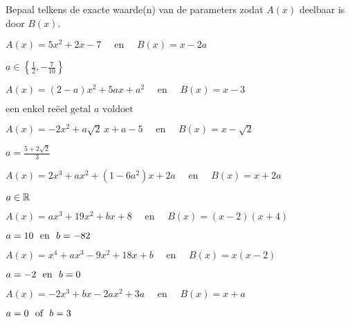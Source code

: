 \documentclass{ximera}
\begin{document}
\begin{exercise}
Bepaal telkens de exacte waarde(n) van de parameters zodat $A(x)$ deelbaar is door $B(x)$. 
	\begin{question} \( A(x) = 5x^2+2x-7                    \quad \text{ en } \quad B(x) = x-2a       \) \begin{uitkomst} \( a \in \left\{\frac{1}{2}, -\frac{7}{10}\right\} \) \end{uitkomst} \end{question} 
	\begin{question} \( A(x) = (2-a)x^2 + 5ax + a^2         \quad \text{ en } \quad B(x) = x-3        \) \begin{uitkomst} \( \text{een enkel reëel getal $a$ voldoet}        \) \end{uitkomst} \end{question} 
	\begin{question} \( A(x) = -2x^2 + a\sqrt{2}\,x + a-5   \quad \text{ en } \quad B(x) = x-\sqrt{2} \) \begin{uitkomst} \( a = \frac{5+2\sqrt{2}}{3}                       \) \end{uitkomst} \end{question} 
	\begin{question} \( A(x) = 2x^3 + ax^2 + (1-6a^2)x + 2a \quad \text{ en } \quad B(x) = x+2a       \) \begin{uitkomst} \( a \in \mathbb{R}                                        \) \end{uitkomst} \end{question} 
	\begin{question} \( A(x) = ax^3 + 19x^2 + bx + 8        \quad \text{ en } \quad B(x) = (x-2)(x+4) \) \begin{uitkomst} \( a = 10$ \text{ en } $b = -82                             \) \end{uitkomst} \end{question} 
	\begin{question} \( A(x) = x^4 + ax^3 - 9x^2 + 18x + b  \quad \text{ en } \quad B(x) = x(x-2)     \) \begin{uitkomst} \( a = -2$ \text{ en } $b = 0                               \) \end{uitkomst} \end{question} 
	\begin{question} \( A(x) = -2x^3 + bx - 2ax^2 + 3a      \quad \text{ en } \quad B(x) = x+a        \) \begin{uitkomst} \( a = 0$ \text{ of } $b = 3                                \) \end{uitkomst} \end{question} 

\end{exercise}
\end{document}
